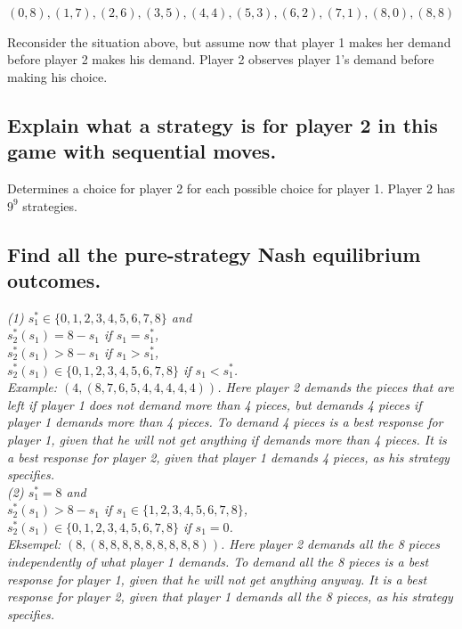 \documentclass{article}
\begin{document}
$(0,8),(1,7),(2,6),(3,5),(4,4),(5,3),(6,2),(7,1),(8,0),(8,8)$
%

Reconsider the situation above, but assume now that player 1 makes her demand before
player 2 makes his demand. Player 2 observes player 1's demand before making his choice.
%
%
\subsection{Explain what a strategy is for player 2 in this game with sequential moves.}

Determines a choice for player 2 for each possible choice for player 1. Player 2 has $9^9$ strategies.
%
\subsection{Find all the pure-strategy Nash equilibrium outcomes. }

\textit{(1) $s^\ast_1 \in \{0,1,2,3,4,5,6,7,8\}$ and \\
$s^\ast_2(s_1) = 8 - s_1$ if $s_1 = s^\ast_1$, \\
$s^\ast_2(s_1) > 8 - s_1$ if $s_1 > s^\ast_1$, \\
$s^\ast_2(s_1) \in \{0,1,2,3,4,5,6,7,8\}$ if $s_1 < s^\ast_1$. \\
\textit{Example:} $(4, (8,7,6,5,4,4,4,4,4))$\textit{. Here player 2 demands the pieces that are left if player 1 does not demand more than 4 pieces, but demands 4 pieces if player 1 demands more than 4 pieces. To demand 4 pieces is a best response for player 1, given that he will not get anything if demands more than 4 pieces. It is a best response for player 2, given that player 1 demands 4 pieces, as his strategy specifies.} \\
(2) $s^\ast_1 = 8$ and \\
$s^\ast_2(s_1) > 8 - s_1$ if $s_1 \in \{1,2,3,4,5,6,7,8\}$, \\
$s^\ast_2(s_1) \in \{0,1,2,3,4,5,6,7,8\}$ if $s_1 = 0$.} \\
\textit{Eksempel:} $(8, (8,8,8,8,8,8,8,8,8))$\textit{. Here player 2 demands all the 8 pieces independently of what player 1 demands. To demand all the 8 pieces is a best response for player 1, given that he will not get anything anyway. It is a best response for player 2, given that player 1 demands all the 8 pieces, as his strategy specifies.}

%
\end{document}
